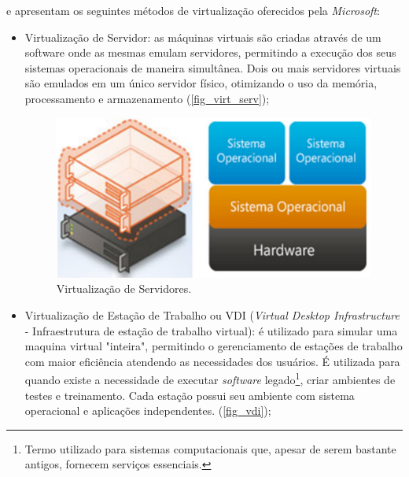  e  apresentam os seguintes métodos de virtualização oferecidos pela \textit{Microsoft}:
\begin{itemize}
    \item Virtualização de Servidor: as máquinas virtuais são criadas através de um software onde as mesmas emulam servidores, permitindo a execução dos seus sistemas operacionais de maneira simultânea. Dois ou mais servidores virtuais são emulados em um único servidor físico, otimizando o uso da memória, processamento e armazenamento (\autoref{fig_virt_serv});
    
    \begin{figure}[htb]
    	\caption{\label{fig_virt_serv}Virtualização de Servidores.}
    	\begin{center}
    	    \includegraphics[scale=0.3]{imagens/virtualizacao-servidor.jpg}
    	\end{center}
    \end{figure}
    
    \item Virtualização de Estação de Trabalho ou VDI (\textit{Virtual Desktop Infrastructure} - Infraestrutura de estação de trabalho virtual): é utilizado para simular uma maquina virtual "inteira", permitindo o gerenciamento de estações de trabalho com maior eficiência atendendo as necessidades dos usuários. É utilizada para quando existe a necessidade de executar \textit{software} legado\footnote{Termo utilizado para sistemas computacionais que, apesar de serem bastante antigos, fornecem serviços essenciais.}, criar ambientes de testes e treinamento. Cada estação possui seu ambiente com sistema operacional e aplicações independentes. (\autoref{fig_vdi});
    

\end{itemize}
